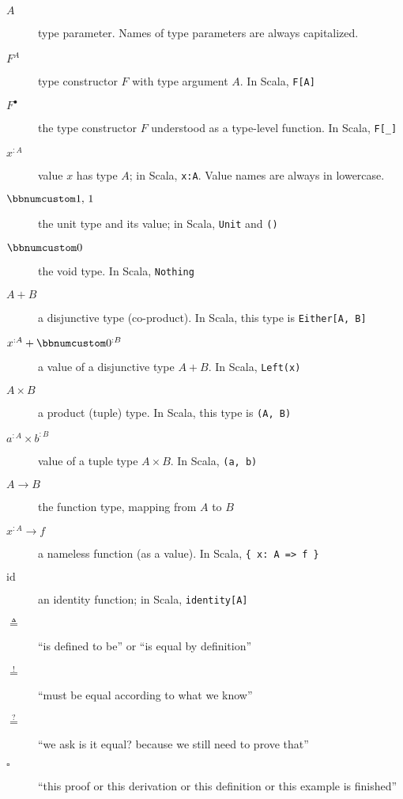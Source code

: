\begin{description}
\item [{$A$}] \textemdash{} type parameter. Names of type parameters are
always capitalized.
\item [{$F^{A}$}] \textemdash{} type constructor $F$ with type argument
$A$. In Scala, \lstinline!F[A]!
\item [{$F^{\bullet}$}] \textemdash{} the type constructor $F$ understood
as a type-level function. In Scala, \lstinline!F[_]! 
\item [{$x^{:A}$}] \textemdash{} value $x$ has type $A$; in Scala, \lstinline!x:A!.
Value names are always in lowercase.
\item [{$\bbnum 1,\,1$}] \textemdash{} the unit type and its value; in
Scala, \lstinline!Unit! and \lstinline!()!
\item [{$\bbnum 0$}] \textemdash{} the void type. In Scala, \lstinline!Nothing!
\item [{$A+B$}] \textemdash{} a disjunctive type (co-product). In Scala,
this type is \lstinline!Either[A, B]! 
\item [{$x^{:A}+\bbnum 0^{:B}$}] \textemdash{} a value of a disjunctive
type $A+B$. In Scala, \lstinline!Left(x)!
\item [{$A\times B$}] \textemdash{} a product (tuple) type. In Scala,
this type is \lstinline!(A, B)!
\item [{$a^{:A}\times b^{:B}$}] value of a tuple type $A\times B$. In
Scala, \lstinline!(a, b)!
\item [{$A\rightarrow B$}] \textemdash{} the function type, mapping from
$A$ to $B$
\item [{$x^{:A}\rightarrow f$}] \textemdash{} a nameless function (as
a value). In Scala, \lstinline!{ x: A => f }!
\item [{$\text{id}$}] \textemdash{} an identity function; in Scala, \lstinline!identity[A]!
\item [{$\triangleq$}] \textemdash{} \textsf{``}is defined to be\textsf{''} or \textsf{``}is equal
by definition\textsf{''}
\item [{$\overset{!}{=}$}] \textemdash{} \textsf{``}must be equal according to
what we know\textsf{''}
\item [{$\overset{?}{=}$}] \textemdash{} \textsf{``}we ask \textemdash{} is it
equal? \textemdash{} because we still need to prove that\textsf{''}
\item [{$\square$}] \textemdash{} \textsf{``}this proof or this derivation or
this definition or this example is finished\textsf{''}

\end{description}
